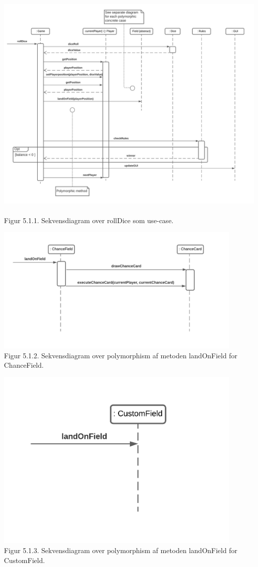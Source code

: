 \begin{flushleft}
\includegraphics[width=1\textwidth]{Report/figures/Sekvensdiagram1.png}~\\[0cm]
Figur 5.1.1. Sekvensdiagram over rollDice som use-case.

\includegraphics[width=0.9\textwidth]{Report/figures/Sekvensdiagram_ChanceField.png}~\\[0cm]
Figur 5.1.2. Sekvensdiagram over polymorphism af metoden landOnField for ChanceField.


\includegraphics[width=0.9\textwidth]{Report/figures/Sekvensdiagram_CustomField.png}~\\[0cm]
Figur 5.1.3. Sekvensdiagram over polymorphism af metoden landOnField for CustomField.



\end{flushleft}
